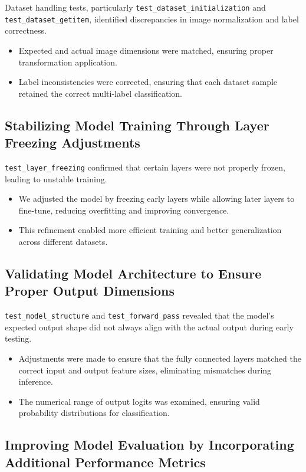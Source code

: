 \documentclass[12pt, titlepage]{article}
\begin{document}
Dataset handling tests, particularly \texttt{test\_dataset\_initialization} and \texttt{test\_dataset\_getitem}, identified discrepancies in image normalization and label correctness.
\begin{itemize}
    \item Expected and actual image dimensions were matched, ensuring proper transformation application.
    \item Label inconsistencies were corrected, ensuring that each dataset sample retained the correct multi-label classification.
\end{itemize}

\subsection{Stabilizing Model Training Through Layer Freezing Adjustments}

\texttt{test\_layer\_freezing} confirmed that certain layers were not properly frozen, leading to unstable training.
\begin{itemize}
    \item We adjusted the model by freezing early layers while allowing later layers to fine-tune, reducing overfitting and improving convergence.
    \item This refinement enabled more efficient training and better generalization across different datasets.
\end{itemize}

\subsection{Validating Model Architecture to Ensure Proper Output Dimensions}

\texttt{test\_model\_structure} and \texttt{test\_forward\_pass} revealed that the model's expected output shape did not always align with the actual output during early testing.
\begin{itemize}
    \item Adjustments were made to ensure that the fully connected layers matched the correct input and output feature sizes, eliminating mismatches during inference.
    \item The numerical range of output logits was examined, ensuring valid probability distributions for classification.
\end{itemize}

\subsection{Improving Model Evaluation by Incorporating Additional Performance Metrics}
\end{document}
